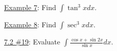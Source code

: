 \documentclass[paper=a4, fontsize=11pt]{scrartcl} %
\numberwithin{equation}{section} %
\numberwithin{figure}{section} %
\numberwithin{table}{section} %
\newcommand{\ds}{\displaystyle}
\begin{document}
\indent

\newpage
\underline{Example 7}: Find $\ds\int \tan^3 x dx$.\\
\indent

\vspace{3in}

\underline{Example 8}: Find $\ds\int \sec^3 x dx$.\\
\indent

\vspace{3in}

\underline{7.2 \#19}: Evaluate $\ds\int \ds\frac{\cos x + \sin 2x}{\sin x}dx$.\\
\indent

\vspace{3.25in}


\end{document}

